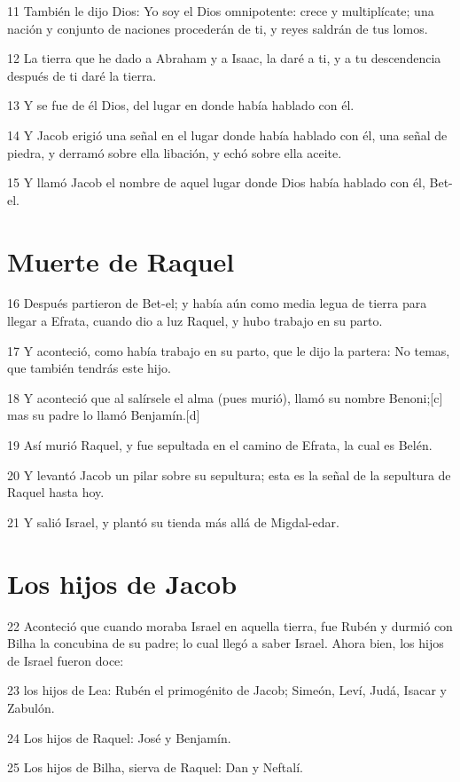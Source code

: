 11 También le dijo Dios: Yo soy el Dios omnipotente: crece y multiplícate; una nación y conjunto de naciones procederán de ti, y reyes saldrán de tus lomos.

12 La tierra que he dado a Abraham y a Isaac, la daré a ti, y a tu descendencia después de ti daré la tierra.

13 Y se fue de él Dios, del lugar en donde había hablado con él.

14 Y Jacob erigió una señal en el lugar donde había hablado con él, una señal de piedra, y derramó sobre ella libación, y echó sobre ella aceite.

15 Y llamó Jacob el nombre de aquel lugar donde Dios había hablado con él, Bet-el.

\section{Muerte de Raquel}

16 Después partieron de Bet-el; y había aún como media legua de tierra para llegar a Efrata, cuando dio a luz Raquel, y hubo trabajo en su parto.

17 Y aconteció, como había trabajo en su parto, que le dijo la partera: No temas, que también tendrás este hijo.

18 Y aconteció que al salírsele el alma (pues murió), llamó su nombre Benoni;[c] mas su padre lo llamó Benjamín.[d]

19 Así murió Raquel, y fue sepultada en el camino de Efrata, la cual es Belén.

20 Y levantó Jacob un pilar sobre su sepultura; esta es la señal de la sepultura de Raquel hasta hoy.

21 Y salió Israel, y plantó su tienda más allá de Migdal-edar.

\section{Los hijos de Jacob}

22 Aconteció que cuando moraba Israel en aquella tierra, fue Rubén y durmió con Bilha la concubina de su padre; lo cual llegó a saber Israel. Ahora bien, los hijos de Israel fueron doce:

23 los hijos de Lea: Rubén el primogénito de Jacob; Simeón, Leví, Judá, Isacar y Zabulón.

24 Los hijos de Raquel: José y Benjamín.

25 Los hijos de Bilha, sierva de Raquel: Dan y Neftalí.

